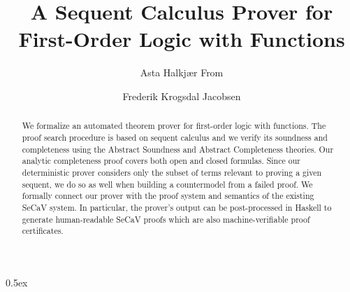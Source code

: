 \documentclass[11pt,a4paper]{report}
\begin{document}
\title{A Sequent Calculus Prover for First-Order Logic with Functions}
\author{Asta Halkjær From \and Frederik Krogsdal Jacobsen}
\maketitle

\begin{abstract}
	We formalize an automated theorem prover for first-order logic with functions.
	The proof search procedure is based on sequent calculus and we verify its soundness and completeness using the Abstract Soundness and Abstract Completeness theories.
	Our analytic completeness proof covers both open and closed formulas.
	Since our deterministic prover considers only the subset of terms relevant to proving a given sequent, we do so as well when building a countermodel from a failed proof.
	We formally connect our prover with the proof system and semantics of the existing SeCaV system.
	In particular, the prover's output can be post-processed in Haskell to generate human-readable SeCaV proofs which are also machine-verifiable proof certificates.
\end{abstract}

\tableofcontents

\parindent 0pt\parskip 0.5ex



%
%
\end{document}
